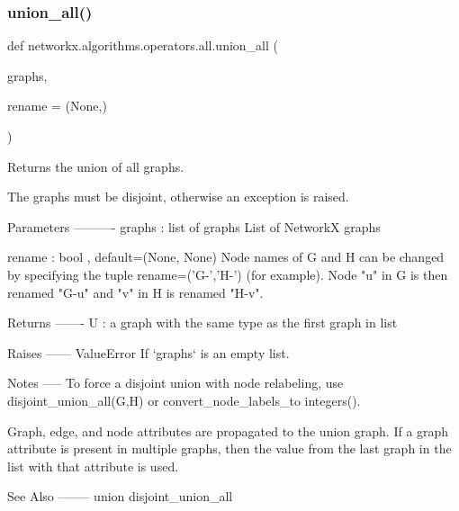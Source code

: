 \subsubsection{\texorpdfstring{union\+\_\+all()}{union\_all()}}
{\footnotesize\ttfamily def networkx.\+algorithms.\+operators.\+all.\+union\+\_\+all (\begin{DoxyParamCaption}\item[{}]{graphs,  }\item[{}]{rename = {\ttfamily (None,)} }\end{DoxyParamCaption})}

\begin{DoxyVerb}Returns the union of all graphs.

The graphs must be disjoint, otherwise an exception is raised.

Parameters
----------
graphs : list of graphs
   List of NetworkX graphs

rename : bool , default=(None, None)
   Node names of G and H can be changed by specifying the tuple
   rename=('G-','H-') (for example).  Node "u" in G is then renamed
   "G-u" and "v" in H is renamed "H-v".

Returns
-------
U : a graph with the same type as the first graph in list

Raises
------
ValueError
   If `graphs` is an empty list.

Notes
-----
To force a disjoint union with node relabeling, use
disjoint_union_all(G,H) or convert_node_labels_to integers().

Graph, edge, and node attributes are propagated to the union graph.
If a graph attribute is present in multiple graphs, then the value
from the last graph in the list with that attribute is used.

See Also
--------
union
disjoint_union_all
\end{DoxyVerb}
 